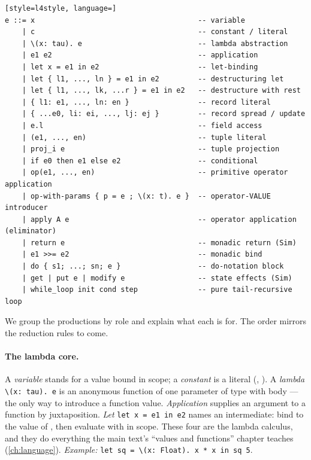 \begin{lstlisting}[style=l4style, language=]
e ::= x                                      -- variable
    | c                                      -- constant / literal
    | \(x: tau). e                           -- lambda abstraction
    | e1 e2                                  -- application
    | let x = e1 in e2                       -- let-binding
    | let { l1, ..., ln } = e1 in e2         -- destructuring let
    | let { l1, ..., lk, ...r } = e1 in e2   -- destructure with rest
    | { l1: e1, ..., ln: en }                -- record literal
    | { ...e0, li: ei, ..., lj: ej }         -- record spread / update
    | e.l                                    -- field access
    | (e1, ..., en)                          -- tuple literal
    | proj_i e                               -- tuple projection
    | if e0 then e1 else e2                  -- conditional
    | op(e1, ..., en)                        -- primitive operator application
    | op-with-params { p = e ; \(x: t). e }  -- operator-VALUE introducer
    | apply A e                              -- operator application (eliminator)
    | return e                               -- monadic return (Sim)
    | e1 >>= e2                              -- monadic bind
    | do { s1; ...; sn; e }                  -- do-notation block
    | get | put e | modify e                 -- state effects (Sim)
    | while_loop init cond step              -- pure tail-recursive loop
\end{lstlisting}

\noindent We group the productions by role and explain what each is for. The
order mirrors the reduction rules to come.

\paragraph{The lambda core.} A \emph{variable}  stands for a value bound
in scope; a \emph{constant}  is a literal (, ). A
\emph{lambda} \lstinline[style=l4style]|\(x: tau). e| is an anonymous function of
one parameter  of type  with body ---the only way to
introduce a function value. \emph{Application}  supplies an argument
to a function by juxtaposition. \emph{Let} \lstinline[style=l4style]|let x = e1 in e2|
names an intermediate: bind  to the value of , then evaluate
 with  in scope. These four are the lambda calculus, and they
do everything the main text's ``values and functions'' chapter teaches
(\cref{ch:language}). \emph{Example:}
\lstinline[style=l4style]|let sq = \(x: Float). x * x in sq 5|.


